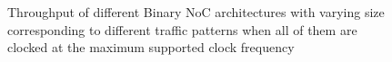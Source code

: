 \begin{figure}[t]
\centering     %
{}
\caption{Throughput of different Binary NoC architectures with varying size corresponding to different traffic patterns when all of them 
are clocked at the maximum supported clock frequency}
\label{fig:tputmax}
\end{figure}

